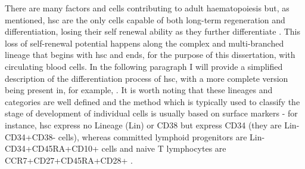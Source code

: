There are many factors and cells contributing to adult haematopoiesis but, as mentioned, \ac{hsc} are the only cells capable of both long-term regeneration and differentiation, losing their self renewal ability as they further differentiate \cite{Rieger2012-bh,Benveniste2010-au}. This loss of self-renewal potential happens along the complex and multi-branched lineage that begins with \ac{hsc} and ends, for the purpose of this dissertation, with circulating blood cells. In the following paragraph I will provide a simplified description of the differentiation process of \ac{hsc}, with a more complete version being present in, for example, \cite{Rieger2012-bh}. It is worth noting that these lineages and categories are well defined and the method which is typically used to classify the stage of development of individual cells is usually based on surface markers \cite{Spangrude1988-xs,Ng2017-cp} - for instance, \ac{hsc} express no Lineage (Lin) or CD38 but express CD34 (they are Lin-CD34+CD38- cells), whereas committed lymphoid progenitors are Lin-CD34+CD45RA+CD10+ cells and naive T lymphocytes are CCR7+CD27+CD45RA+CD28+ \cite{Miller1999-en,Appay2008-sk}.

